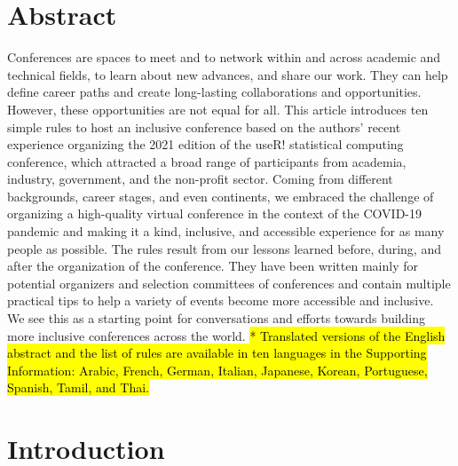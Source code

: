 \documentclass[10pt,letterpaper]{article}
\begin{document}
\section*{Abstract}

Conferences are spaces to meet and to network within and across academic and technical fields, to learn about new advances, and share our work. They can help define career paths and create long-lasting collaborations and opportunities. 
However, these opportunities are not equal for all. 
This article introduces ten simple rules to host an inclusive conference based on the authors' recent experience organizing the 2021 edition of the useR! statistical computing conference, which attracted a broad range of participants from academia, industry, government, and the non-profit sector. 
Coming from different backgrounds, career stages, and even continents, we embraced the challenge of organizing a high-quality virtual conference in the context of the COVID-19 pandemic and making it a kind, inclusive, and accessible experience for as many people as possible.
The rules result from our lessons learned before, during, and after the organization of the conference. 
They have been written mainly for potential organizers and selection committees of conferences and contain multiple practical tips to help a variety of events become more accessible and inclusive. We see this as a starting point for conversations and efforts towards building more inclusive conferences across the world.
\hl{* Translated versions of the English abstract and the list of rules are available in ten languages in the Supporting Information: Arabic, French, German, Italian, Japanese, Korean, Portuguese, Spanish, Tamil, and Thai.}


\linenumbers

\section*{Introduction}
\end{document}
